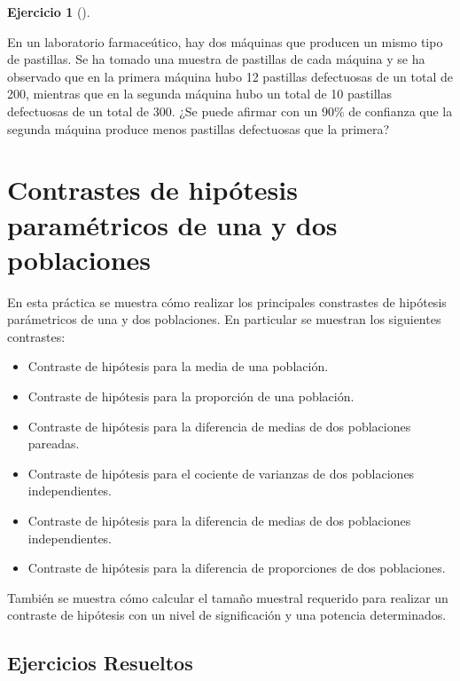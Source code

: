 \documentclass[
  a4paper,
]{scrreport}
\providecommand{\tightlist}{%
  \setlength{\itemsep}{0pt}\setlength{\parskip}{0pt}}\usepackage{longtable,booktabs,array}
\theoremstyle{definition}
\newtheorem{exercise}{Ejercicio}[chapter]
\theoremstyle{remark}
\begin{document}
\begin{exercise}[]\protect\hypertarget{exr-intervalos-confianza-1-poblacion-piezas-defectuosas}{}\label{exr-intervalos-confianza-1-poblacion-piezas-defectuosas}

En un laboratorio farmaceútico, hay dos máquinas que producen un mismo
tipo de pastillas. Se ha tomado una muestra de pastillas de cada máquina
y se ha observado que en la primera máquina hubo 12 pastillas
defectuosas de un total de 200, mientras que en la segunda máquina hubo
un total de 10 pastillas defectuosas de un total de 300. ¿Se puede
afirmar con un 90\% de confianza que la segunda máquina produce menos
pastillas defectuosas que la primera?

\end{exercise}


\chapter{Contrastes de hipótesis paramétricos de una y dos
poblaciones}\label{contrastes-de-hipuxf3tesis-paramuxe9tricos-de-una-y-dos-poblaciones}

En esta práctica se muestra cómo realizar los principales constrastes de
hipótesis parámetricos de una y dos poblaciones. En particular se
muestran los siguientes contrastes:

\begin{itemize}
\tightlist
\item
  Contraste de hipótesis para la media de una población.
\item
  Contraste de hipótesis para la proporción de una población.
\item
  Contraste de hipótesis para la diferencia de medias de dos poblaciones
  pareadas.
\item
  Contraste de hipótesis para el cociente de varianzas de dos
  poblaciones independientes.
\item
  Contraste de hipótesis para la diferencia de medias de dos poblaciones
  independientes.
\item
  Contraste de hipótesis para la diferencia de proporciones de dos
  poblaciones.
\end{itemize}

También se muestra cómo calcular el tamaño muestral requerido para
realizar un contraste de hipótesis con un nivel de significación y una
potencia determinados.

\section{Ejercicios Resueltos}\label{ejercicios-resueltos-6}
\end{document}

